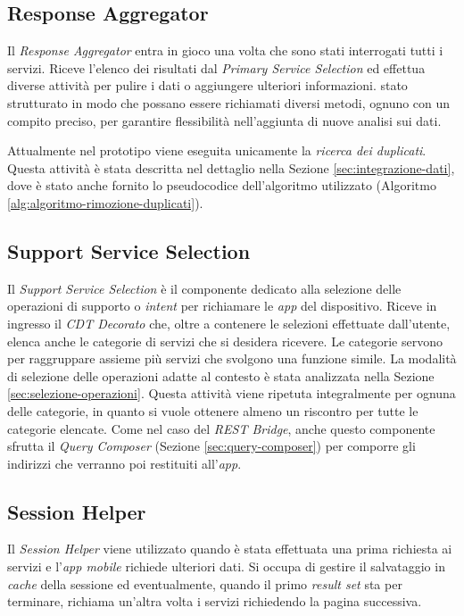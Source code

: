 \subsection{Response Aggregator\label{sec:response-aggregator}}

Il \emph{Response Aggregator} entra in gioco una volta che sono stati interrogati tutti i servizi. Riceve l'elenco dei risultati dal \emph{Primary Service Selection} ed effettua diverse attività per pulire i dati o aggiungere ulteriori informazioni. \upe stato strutturato in modo che possano essere richiamati diversi metodi, ognuno con un compito preciso, per garantire flessibilità nell'aggiunta di nuove analisi sui dati.

Attualmente nel prototipo viene eseguita unicamente la \emph{ricerca dei duplicati}. Questa attività è stata descritta nel dettaglio nella Sezione \ref{sec:integrazione-dati}, dove è stato anche fornito lo pseudocodice dell'algoritmo utilizzato (Algoritmo \ref{alg:algoritmo-rimozione-duplicati}).

\subsection{Support Service Selection\label{sec:support-service-selection}}

Il \emph{Support Service Selection} è il componente dedicato alla selezione delle operazioni di supporto o \emph{intent} per richiamare le \emph{app} del dispositivo. Riceve in ingresso il \emph{CDT Decorato} che, oltre a contenere le selezioni effettuate dall'utente, elenca anche le categorie di servizi che si desidera ricevere. Le categorie servono per raggruppare assieme più servizi che svolgono una funzione simile. La modalità di selezione delle operazioni adatte al contesto è stata analizzata nella Sezione \ref{sec:selezione-operazioni}. Questa attività viene ripetuta integralmente per ognuna delle categorie, in quanto si vuole ottenere almeno un riscontro per tutte le categorie elencate. Come nel caso del \emph{REST Bridge}, anche questo componente sfrutta il \emph{Query Composer} (Sezione \ref{sec:query-composer}) per comporre gli indirizzi che verranno poi restituiti all'\emph{app}.

\subsection{Session Helper\label{sec:session-helper}}

Il \emph{Session Helper} viene utilizzato quando è stata effettuata una prima richiesta ai servizi e l'\emph{app mobile} richiede ulteriori dati. Si occupa di gestire il salvataggio in \emph{cache} della sessione ed eventualmente, quando il primo \emph{result set} sta per terminare, richiama un'altra volta i servizi richiedendo la pagina successiva.

